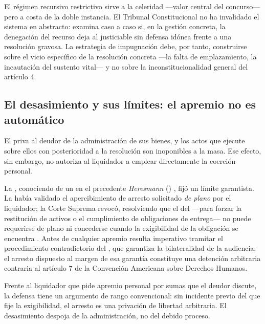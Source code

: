 \begin{foco}
El régimen recursivo restrictivo sirve a la celeridad ---valor central del concurso--- pero a
costa de la doble instancia. El Tribunal Constitucional no ha invalidado el sistema en
abstracto: examina caso a caso si, en la gestión concreta, la denegación del recurso deja al
justiciable sin defensa idónea frente a una resolución gravosa. La estrategia de impugnación
debe, por tanto, construirse sobre el vicio específico de la resolución concreta ---la falta de
emplazamiento, la incautación del sustento vital--- y no sobre la inconstitucionalidad general
del artículo 4.
\end{foco}

\subsection{El desasimiento y sus límites: el apremio no es automático}

El  priva al deudor de la administración de sus bienes, y los actos que ejecute sobre
ellos con posterioridad a la resolución son inoponibles a la masa. Ese efecto, sin embargo, no
autoriza al liquidador a emplear directamente la coerción personal.

La \csup{}, conociendo de un  en el precedente \emph{Heresmann}
() \parencite{juris-cs-heresmann}, fijó un límite garantista. La 
había validado el apercibimiento de arresto solicitado \emph{de plano} por el liquidador; la Corte
Suprema revocó, resolviendo que el  del  ---para forzar la restitución
de activos o el cumplimiento de obligaciones de entrega--- no puede requerirse de plano ni
concederse cuando la exigibilidad de la obligación se encuentra . Antes de
cualquier apremio resulta imperativo tramitar el procedimiento contradictorio del , que
garantiza la bilateralidad de la audiencia; el arresto dispuesto al margen de esa garantía
constituye una detención arbitraria contraria al artículo 7 de la Convención Americana sobre
Derechos Humanos.

\begin{alerta}
Frente al liquidador que pide apremio personal por sumas que el deudor discute, la defensa tiene un
argumento de rango convencional: sin incidente previo del  que fije la exigibilidad, el
arresto es una privación de libertad arbitraria. El desasimiento despoja de la administración, no
del debido proceso.
\end{alerta}


